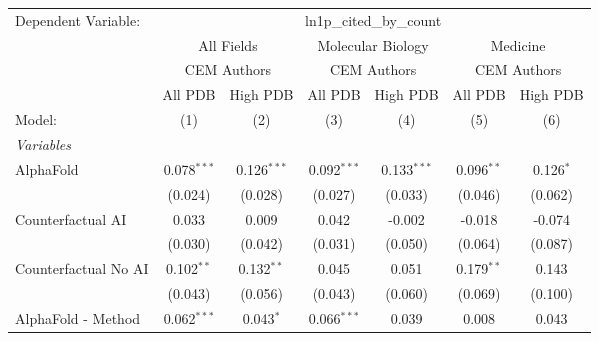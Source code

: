 \begingroup
\centering
\begin{tabular}{lcccccc}
   \tabularnewline \midrule \midrule
   Dependent Variable: & \multicolumn{6}{c}{ln1p\_cited\_by\_count}\\
 & \multicolumn{2}{c}{All Fields} & \multicolumn{2}{c}{Molecular Biology} & \multicolumn{2}{c}{Medicine} \\
\cmidrule(lr){2-3} \cmidrule(lr){4-5} \cmidrule(lr){6-7}
 & \multicolumn{2}{c}{CEM Authors} & \multicolumn{2}{c}{CEM Authors} & \multicolumn{2}{c}{CEM Authors} \\
\cmidrule(lr){2-3} \cmidrule(lr){4-5} \cmidrule(lr){6-7}
 & \multicolumn{1}{c}{All PDB} & \multicolumn{1}{c}{High PDB} & \multicolumn{1}{c}{All PDB} & \multicolumn{1}{c}{High PDB} & \multicolumn{1}{c}{All PDB} & \multicolumn{1}{c}{High PDB} \\
\cmidrule(lr){2-2} \cmidrule(lr){3-3} \cmidrule(lr){4-4} \cmidrule(lr){5-5} \cmidrule(lr){6-6} \cmidrule(lr){7-7}
   Model:                                                     & (1)           & (2)           & (3)           & (4)           & (5)          & (6)\\  
   \midrule
   \emph{Variables}\\
   AlphaFold                                                  & 0.078$^{***}$ & 0.126$^{***}$ & 0.092$^{***}$ & 0.133$^{***}$ & 0.096$^{**}$ & 0.126$^{*}$\\   
                                                              & (0.024)       & (0.028)       & (0.027)       & (0.033)       & (0.046)      & (0.062)\\   
   Counterfactual AI                                          & 0.033         & 0.009         & 0.042         & -0.002        & -0.018       & -0.074\\   
                                                              & (0.030)       & (0.042)       & (0.031)       & (0.050)       & (0.064)      & (0.087)\\   
   Counterfactual No AI                                       & 0.102$^{**}$  & 0.132$^{**}$  & 0.045         & 0.051         & 0.179$^{**}$ & 0.143\\   
                                                              & (0.043)       & (0.056)       & (0.043)       & (0.060)       & (0.069)      & (0.100)\\   
   AlphaFold - Method                                         & 0.062$^{***}$ & 0.043$^{*}$   & 0.066$^{***}$ & 0.039         & 0.008        & 0.043\\   

\end{tabular}
